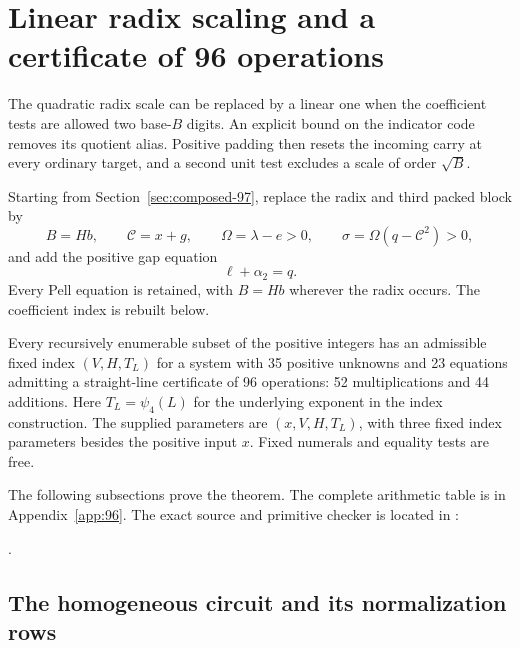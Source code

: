 \section{Linear radix scaling and a certificate of 96 operations}
\label{sec:linear-radix}

The quadratic radix scale can be replaced by a linear one when the
coefficient tests are allowed two base-$B$ digits. An explicit bound
on the indicator code removes its quotient alias. Positive padding
then resets the incoming carry at every ordinary target, and a
second unit test excludes a scale of order $\sqrt B$.

Starting from Section~\ref{sec:composed-97}, replace the radix and
third packed block by
\begin{equation}\label{eq:linear-radix-block}
 B=Hb,\qquad \mathcal C=x+g,\qquad
 \Omega=\lambda-e>0,\qquad
 \sigma=\Omega(q-\mathcal C^2)>0,
\end{equation}
and add the positive gap equation
\begin{equation}\label{eq:linear-radix-gap}
 \ell+\alpha_2=q.
\end{equation}
Every Pell equation is retained, with $B=Hb$ wherever the radix
occurs. The coefficient index is rebuilt below.

\begin{theorem}\label{thm:best96}
Every recursively enumerable subset of the positive integers has
an admissible fixed index $(V,H,T_L)$ for a system with 35 positive
unknowns and 23 equations admitting a straight-line certificate of
96 operations: 52 multiplications and 44 additions. Here
$T_L=\psi_4(L)$ for the underlying exponent in the index
construction. The supplied parameters are $(x,V,H,T_L)$, with
three fixed index parameters besides the positive input $x$.
Fixed numerals and equality tests are free.
\end{theorem}

The following subsections prove the theorem. The complete arithmetic
table is in Appendix~\ref{app:96}. The exact source and primitive
checker is located in :
\begin{center}
\small{}.
\end{center}

\subsection{The homogeneous circuit and its normalization rows}

